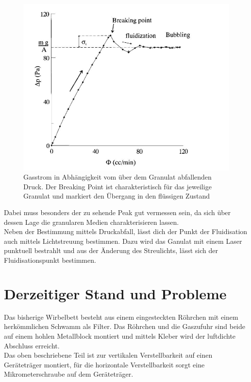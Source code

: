 \begin{figure}[h]
	\begin{center}
		\includegraphics[scale=0.6]{Castellanos_Diagramm.jpg}
		\caption{Gasstrom in Abhängigkeit vom über dem Granulat abfallenden Druck. Der Breaking Point ist charakteristisch für das jeweilige Granulat und markiert den Übergang in den flüssigen Zustand \cite{Castellanos2000}}
	\end{center}
\end{figure}

Dabei muss besonders der zu sehende Peak gut vermessen sein, da sich über dessen Lage die granularen Medien charakterisieren lassen. \\
Neben der Bestimmung mittels Druckabfall, lässt dich der Punkt der Fluidisation auch mittels Lichtstreuung bestimmen. Dazu wird das Ganulat mit einem Laser punktuell bestrahlt und aus der Änderung des Streulichts, lässt sich der Fluidisationspunkt bestimmen. 


\section{Derzeitiger Stand und Probleme}


Das bisherige Wirbelbett besteht aus einem eingesteckten Röhrchen mit einem herkömmlichen Schwamm als Filter. Das Röhrchen und die Gaszufuhr sind beide auf einem hohlen Metallblock montiert und mittels Kleber wird der luftdichte Abschluss erreicht. \\
Das oben beschriebene Teil ist zur vertikalen Verstellbarkeit auf einen Geräteträger montiert, für die horizontale Verstellbarkeit sorgt eine Mikrometerschraube auf dem Geräteträger. 


